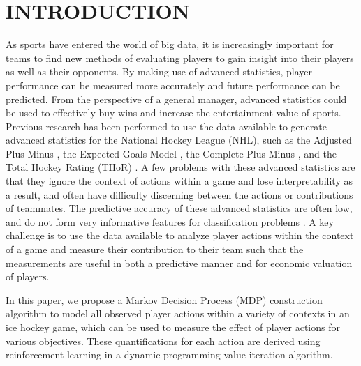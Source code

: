 \documentclass[]{article}
\begin{document}


\section{INTRODUCTION}

As sports have entered the world of big data, it is increasingly important for teams to find new methods of evaluating players to gain insight into their players as well as their opponents. By making use of advanced statistics, player performance can be measured more accurately and future performance can be predicted. From the perspective of a general manager, advanced statistics could be used to effectively buy wins and increase the entertainment value of sports. Previous research has been performed to use the data available to generate advanced statistics for the National Hockey League (NHL), such as the Adjusted Plus-Minus \citep{Macdonald2011a}, the Expected Goals Model \citep{Macdonald2012}, the Complete Plus-Minus \citep{Spagnola2013}, and the Total Hockey Rating (THoR) \citep{Schuckers2013}. A few problems with these advanced statistics are that they ignore the context of actions within a game and lose interpretability as a result, and often have difficulty discerning between the actions or contributions of teammates. The predictive accuracy of these advanced statistics are often low, and do not form very informative features for classification problems \citep{Weissbock2014}. A key challenge is to use the data available to analyze player actions within the context of a game and measure their contribution to their team such that the measurements are useful in both a predictive manner and for economic valuation of players.

In this paper, we propose a Markov Decision Process (MDP) construction algorithm to model all observed player actions within a variety of contexts in an ice hockey game, which can be used to measure the effect of player actions for various objectives. These quantifications for each action are derived using reinforcement learning in a dynamic programming value iteration algorithm.


\end{document}
